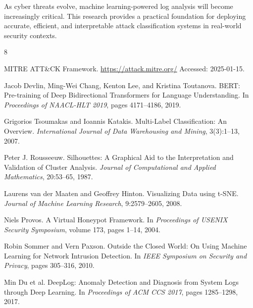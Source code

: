 \documentclass[acmlarge,screen,nonacm]{acmart}
\begin{document}
As cyber threats evolve, machine learning-powered log analysis will become increasingly critical. This research provides a practical foundation for deploying accurate, efficient, and interpretable attack classification systems in real-world security contexts.

\begin{thebibliography}{8}

MITRE ATT\&CK Framework.
\newblock \url{https://attack.mitre.org/}
\newblock Accessed: 2025-01-15.

Jacob Devlin, Ming-Wei Chang, Kenton Lee, and Kristina Toutanova.
\newblock BERT: Pre-training of Deep Bidirectional Transformers for Language Understanding.
\newblock In \textit{Proceedings of NAACL-HLT 2019}, pages 4171--4186, 2019.

Grigorios Tsoumakas and Ioannis Katakis.
\newblock Multi-Label Classification: An Overview.
\newblock \textit{International Journal of Data Warehousing and Mining}, 3(3):1--13, 2007.

Peter J. Rousseeuw.
\newblock Silhouettes: A Graphical Aid to the Interpretation and Validation of Cluster Analysis.
\newblock \textit{Journal of Computational and Applied Mathematics}, 20:53--65, 1987.

Laurens van der Maaten and Geoffrey Hinton.
\newblock Visualizing Data using t-SNE.
\newblock \textit{Journal of Machine Learning Research}, 9:2579--2605, 2008.

Niels Provos.
\newblock A Virtual Honeypot Framework.
\newblock In \textit{Proceedings of USENIX Security Symposium}, volume 173, pages 1--14, 2004.

Robin Sommer and Vern Paxson.
\newblock Outside the Closed World: On Using Machine Learning for Network Intrusion Detection.
\newblock In \textit{IEEE Symposium on Security and Privacy}, pages 305--316, 2010.

Min Du et al.
\newblock DeepLog: Anomaly Detection and Diagnosis from System Logs through Deep Learning.
\newblock In \textit{Proceedings of ACM CCS 2017}, pages 1285--1298, 2017.

\end{thebibliography}

\appendix
\clearpage
\end{document}
